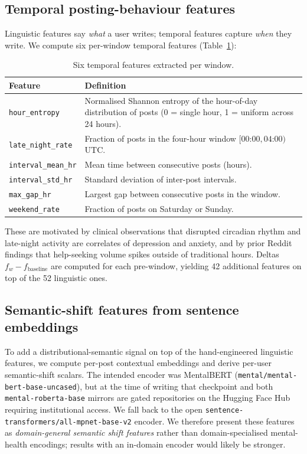 \documentclass[11pt]{article}
\begin{document}
\subsection{Temporal posting-behaviour features}
\label{sec:temporal}
Linguistic features say \emph{what} a user writes; temporal features
capture \emph{when} they write.
We compute six per-window temporal features (Table~\ref{tab:temporal}):

\begin{table}[h]
\small
\centering
\begin{tabular}{lp{5cm}}
\toprule
\textbf{Feature} & \textbf{Definition} \\
\midrule
\texttt{hour\_entropy} &
  Normalised Shannon entropy of the hour-of-day distribution of posts
  (0 = single hour, 1 = uniform across 24 hours). \\
\texttt{late\_night\_rate} &
  Fraction of posts in the four-hour window $[\text{00:00}, \text{04:00})$ UTC. \\
\texttt{interval\_mean\_hr} &
  Mean time between consecutive posts (hours). \\
\texttt{interval\_std\_hr} &
  Standard deviation of inter-post intervals. \\
\texttt{max\_gap\_hr} &
  Largest gap between consecutive posts in the window. \\
\texttt{weekend\_rate} &
  Fraction of posts on Saturday or Sunday. \\
\bottomrule
\end{tabular}
\caption{Six temporal features extracted per window.}
\label{tab:temporal}
\end{table}

These are motivated by clinical observations that disrupted circadian
rhythm and late-night activity are correlates of depression and
anxiety, and by prior Reddit findings that help-seeking volume spikes
outside of traditional hours.
Deltas $f_w - f_{\text{baseline}}$ are computed for each pre-window,
yielding 42 additional features on top of the 52 linguistic ones.

\subsection{Semantic-shift features from sentence embeddings}
\label{sec:embeddings}
To add a distributional-semantic signal on top of the hand-engineered
linguistic features, we compute per-post contextual embeddings and
derive per-user semantic-shift scalars.
The intended encoder was MentalBERT
(\texttt{mental/mental-bert-base-uncased}), but at the time of writing
that checkpoint and both \texttt{mental-roberta-base} mirrors are
gated repositories on the Hugging Face Hub requiring institutional
access.
We fall back to the open \texttt{sentence-transformers/all-mpnet-base-v2}
encoder.
We therefore present these features as \emph{domain-general semantic
shift features} rather than domain-specialised mental-health encodings;
results with an in-domain encoder would likely be stronger.
\end{document}
